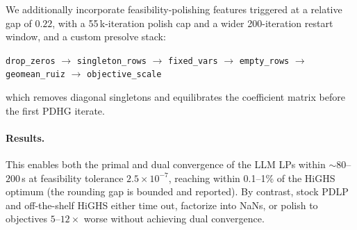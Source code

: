 We additionally incorporate feasibility-polishing features triggered at
a relative gap of $0.22$, with a 55\,k-iteration polish cap and a
wider 200-iteration restart window, and a custom presolve stack:
\begin{center}
\texttt{drop\_zeros}
$\to$ \texttt{singleton\_rows}
$\to$ \texttt{fixed\_vars}
$\to$ \texttt{empty\_rows}
$\to$ \texttt{geomean\_ruiz}
$\to$ \texttt{objective\_scale}
\end{center}
which removes diagonal singletons and equilibrates the coefficient
matrix before the first PDHG iterate.

\paragraph{Results.}
This enables both the primal and dual convergence of the LLM LPs within ${\sim}80$--$200$\,s at feasibility tolerance $2.5\times10^{-7}$, reaching within 0.1--1\% of
the HiGHS optimum (the rounding gap is bounded and reported). By
contrast, stock PDLP and off-the-shelf HiGHS either time out,
factorize into NaNs, or polish to objectives $5$--$12\times$ worse
without achieving dual convergence.